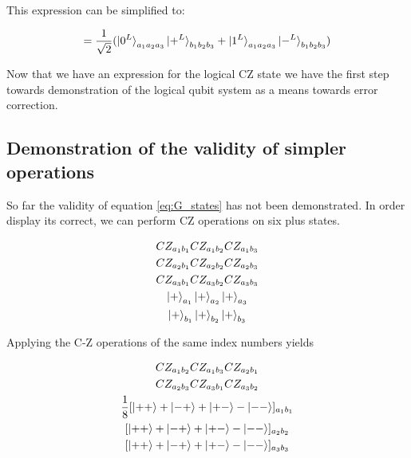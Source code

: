 This expression can be simplified to: 

\begin{equation}
= \frac{1}{\sqrt{2}} (\ket{0^{L}}_{a_{1}a_{2}a_{3}} \ket{+^{L}}_{b_{1}b_{2}b_{3}} + \ket{1^{L}}_{a_{1}a_{2}a_{3}} \ket{-^{L}}_{b_{1}b_{2}b_{3}})
\end{equation}

Now that we have an expression for the logical CZ state we have the first step towards demonstration of the logical qubit system as a means towards error correction. 


\subsection{Demonstration of the validity of simpler operations}


So far the validity of equation \eqref{eq:G_states} has not been demonstrated. In order display its correct, we can perform CZ operations on six plus states.

\begin{multline*}
                       CZ _{a_{1} b_{1}} CZ _{a_{1} b_{2}} CZ _{a_{1} b_{3}} \\
CZ _{a_{2} b_{1}} CZ _{a_{2} b_{2}} CZ _{a_{2} b_{3}} \\
CZ _{a_{3} b_{1}} CZ _{a_{3} b_{2}} CZ _{a_{3} b_{3}} \\
\ket{+} _{a_{1}} \ket{+} _{a_{2}} \ket{+} _{a_{3}} \\
\ket{+} _{b_{1}} \ket{+} _{b_{2}} \ket{+} _{b_{3}} \\
\end{multline*}

Applying the C-Z operations of the same index numbers yields

\begin{multline*}
CZ _{a_{1} b_{2}} CZ _{a_{1} b_{3}} CZ _{a_{2} b_{1}} \\
CZ _{a_{2} b_{3}} CZ _{a_{3} b_{1}} CZ _{a_{3} b_{2}} \\
\frac{1}{8} 
[ \ket{+ +} + \ket{- +} + \ket{+ -} - \ket{- -} ] _{a_{1} b_{1}} \\
[ \ket{+ +} + \ket{- +} + \ket{+ -} - \ket{- -} ] _{a_{2} b_{2}} \\
[ \ket{+ +} + \ket{- +} + \ket{+ -} - \ket{- -} ] _{a_{3} b_{3}} \\
\end{multline*}


